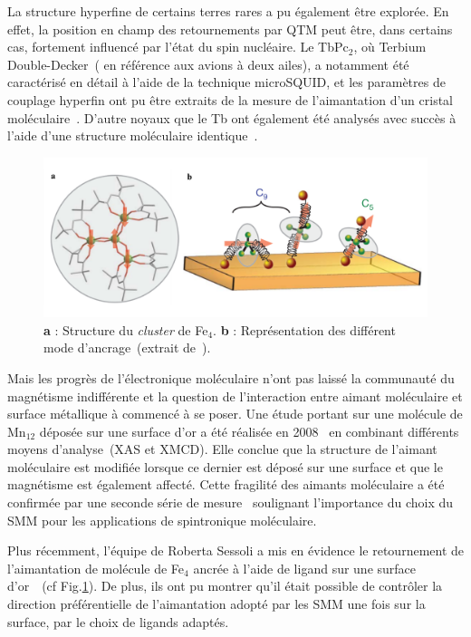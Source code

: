 La structure hyperfine de certains terres rares a pu également être explorée. En effet, la position en champ des retournements par QTM peut être, dans certains cas, fortement influencé par l'état du spin nucléaire. Le TbPc$_{2}$, où Terbium Double-Decker~( en référence aux avions à deux ailes), a notamment été caractérisé en détail à l'aide de la technique microSQUID, et les paramètres de couplage hyperfin ont pu être extraits de la mesure de l'aimantation d'un cristal moléculaire~\cite{Ishikawa2005}. D'autre noyaux que le Tb ont également été analysés avec succès à l'aide d'une structure moléculaire identique~\cite{Ishikawa2005a}.

\begin{figure}
\centering \includegraphics[scale=0.45]{Spintronique/MolecularMag2/MolecularMag2.pdf}
\caption{\textbf{a} : Structure du \textit{cluster} de Fe$_4$. \textbf{b} : Représentation des différent mode d'ancrage~(extrait de~\cite{Mannini2010}).}
\label{MolecularMag2}
\end{figure}

Mais les progrès de l'électronique moléculaire n'ont pas laissé la communauté du magnétisme indifférente et la question de l'interaction entre aimant moléculaire et surface métallique à commencé à se poser. Une étude portant sur une molécule de Mn$_{12}$ déposée sur une surface d'or a été réalisée en 2008~\cite{Mannini2008} en combinant différents moyens d'analyse~(XAS et XMCD). Elle conclue que la structure de l'aimant moléculaire est modifiée lorsque ce dernier est déposé sur une surface et que le magnétisme est également affecté. Cette fragilité des aimants moléculaire a été confirmée par une seconde série de mesure~\cite{Mannini2009} soulignant l'importance du choix du SMM pour les applications de spintronique moléculaire.

Plus récemment, l'équipe de Roberta Sessoli a mis en évidence le retournement de l'aimantation de molécule de Fe$_{4}$ ancrée à l'aide de ligand sur une surface d'or~\cite{Mannini2010}~(cf Fig.\ref{MolecularMag2}). De plus, ils ont pu montrer qu'il était possible de contrôler la direction préférentielle de l'aimantation adopté par les SMM une fois sur la surface, par le choix de ligands adaptés.

